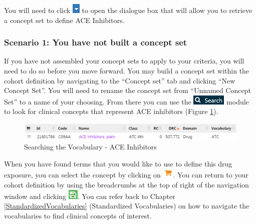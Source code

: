 \documentclass[11pt]{book}
\theoremstyle{definition}
\theoremstyle{definition}
\theoremstyle{definition}
\theoremstyle{remark}
\begin{document}
You will need to click \includegraphics{images/Cohorts/downarrow.png} to open the dialogue box that will allow you to retrieve a concept set to define ACE Inhibitors.

\hypertarget{scenario-1-you-have-not-built-a-concept-set}{%
\subsubsection*{Scenario 1: You have not built a concept set}\label{scenario-1-you-have-not-built-a-concept-set}}

If you have not assembled your concept sets to apply to your criteria, you will need to do so before you move forward. You may build a concept set within the cohort definition by navigating to the ``Concept set'' tab and clicking ``New Concept Set''. You will need to rename the concept set from ``Unnamed Concept Set'' to a name of your choosing. From there you can use the \includegraphics{images/Cohorts/search-2.png} module to look for clinical concepts that represent ACE inhibitors (Figure \ref{fig:aceinhibitors}).

\begin{figure}

{\centering \includegraphics[width=1\linewidth]{images/Cohorts/aceinhibitors} 

}

\caption{Searching the Vocabulary - ACE Inhibitors}\label{fig:aceinhibitors}
\end{figure}

When you have found terms that you would like to use to define this drug exposure, you can select the concept by clicking on \includegraphics{images/Cohorts/shoppingcart.png}. You can return to your cohort definition by using the breadcrumbs at the top of right of the navigation window and clicking \includegraphics{images/Cohorts/save.png}. You can refer back to Chapter \ref{StandardizedVocabularies} (Standardized Vocabularies) on how to navigate the vocabularies to find clinical concepts of interest.
\end{document}
